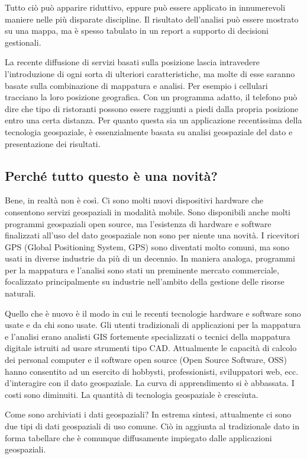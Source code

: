 Tutto ciò può apparire riduttivo, eppure può essere applicato in innumerevoli
maniere nelle più disparate discipline. Il risultato dell'analisi può essere
mostrato su una mappa, ma è spesso tabulato in un report a supporto
di decisioni gestionali.

La recente diffusione di servizi basati sulla posizione lascia intravedere
l'introduzione di ogni sorta di ulteriori caratteristiche, ma molte
di esse saranno basate sulla combinazione di mappatura e analisi.
Per esempio i cellulari tracciano la loro posizione geografica. Con
un programma adatto, il telefono può dire che tipo di ristoranti possono
essere raggiunti a piedi dalla propria posizione entro una certa distanza.
Per quanto questa sia un applicazione recentissima della tecnologia geospaziale,
è essenzialmente basata su analisi geospaziale del dato e presentazione
dei risultati.

\subsection{Perché tutto questo è una novità?}\label{label_whynew}

Bene, in realtà non è così. Ci sono molti nuovi dispositivi hardware
che consentono servizi geospaziali in modalità mobile. Sono disponibili
anche molti programmi geospaziali open source, ma l'esistenza di hardware
e software finalizzati all'uso del dato geospaziale non sono per niente una
novità. I ricevitori GPS (Global Positioning System, GPS) sono diventati
molto comuni, ma sono usati in diverse industrie da più di un decennio.
In maniera analoga, programmi per la mappatura e l'analisi sono stati
un preminente mercato commerciale, focalizzato principalmente su industrie
nell'ambito della gestione delle risorse naturali.

Quello che è nuovo è il modo in cui le recenti tecnologie hardware e software 
sono usate e da chi sono usate. Gli utenti tradizionali di applicazioni
per la mappatura e l'analisi erano analisti GIS fortemente specializzati
o tecnici della mappatura digitale istruiti ad usare strumenti tipo
CAD. Attualmente le capacità di calcolo dei personal computer e il software
open source (Open Source Software, OSS) hanno consentito ad un esercito
di hobbysti, professionisti, sviluppatori web, ecc. d'interagire
con il dato geospaziale. La curva di apprendimento si è abbassata.
I costi sono diminuiti. La quantità di tecnologia geospaziale è cresciuta.

Come sono archiviati i dati geospaziali? In estrema sintesi, attualmente ci sono
due tipi di dati geospaziali di uso comune. Ciò in aggiunta
al tradizionale dato in forma tabellare che è comunque diffusamente
impiegato dalle applicazioni geospaziali.

